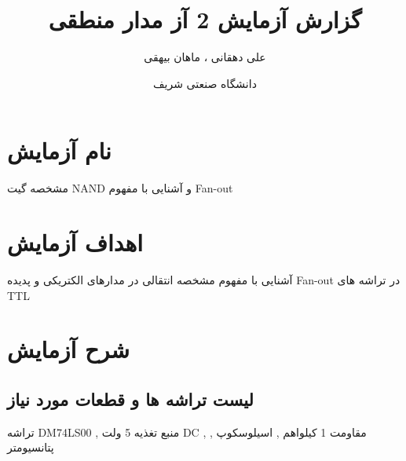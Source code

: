 \documentclass[twoside]{article}
\title{\Huge گزارش آزمایش 2 آز مدار منطقی }
\author{\Large علی دهقانی ، ماهان بیهقی}
\date{دانشگاه صنعتی شریف}
\begin{document}
	\maketitle
	\newpage
	\section*{نام آزمایش}
	مشخصه گیت NAND و آشنایی با مفهوم Fan-out
	
	\section*{اهداف آزمایش}
	آشنایی با مفهوم مشخصه انتقالی در مدارهای الکتریکی و پدیده Fan-out در تراشه های TTL
	
	\section*{شرح آزمایش}
	
	\subsection*{لیست تراشه ها و قطعات مورد نیاز}
	تراشه DM74LS00 , منبع تغذیه 5 ولت DC , مقاومت 1 کیلواهم , اسیلوسکوپ , پتانسیومتر
	
\end{document}
